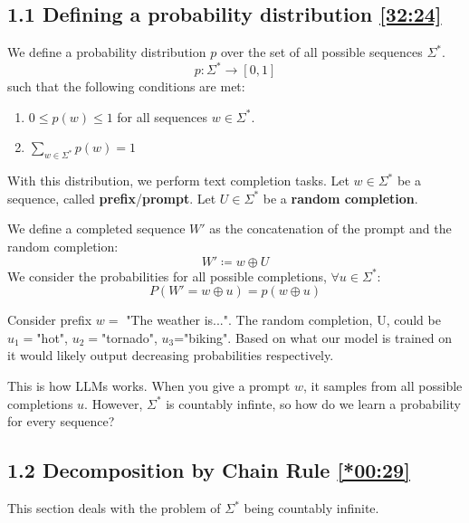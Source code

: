\documentclass[12pt, twoside]{article}
\begin{document}
\subsection*{1.1 Defining a probability distribution \href{https://youtu.be/3bG2Dy7Du0Y?si=g2tHZbM3oEpgRSpv&t=1944}{[32:24]}}

We define a probability distribution $p$ over the set of all possible sequences $\Sigma^*$.
\[ p: \Sigma^* \to [0, 1] \]
such that the following conditions are met:
\begin{enumerate}
    \item $0 \le p(w) \le 1$ for all sequences $w \in \Sigma^*$.
    \item $ \sum_{w \in \Sigma^*} p(w) = 1 $
\end{enumerate}


With this distribution, we perform text completion tasks. Let $w \in \Sigma^*$ be a sequence, called \textbf{prefix}/\textbf{prompt}. Let $U \in \Sigma^*$ be a \textbf{random completion}.

We define a completed sequence $W'$ as the concatenation of the prompt and the random completion:
\[ W' \coloneqq w \oplus U \]
We consider the probabilities for all possible completions, $\forall u \in \Sigma^*$:
\[ P(W' = w \oplus u) = p(w \oplus u) \]

\begin{example}
    Consider prefix $w =$ "The weather is...". The random completion, U, could be $u_1=$"hot", $u_2=$"tornado", $u_3$="biking". Based on what our model is trained on it would likely output decreasing probabilities respectively.
\end{example}

\begin{remark}
This is how LLMs works. When you give a prompt $w$, it samples from all possible completions $u$. However, $\Sigma^*$ is countably infinte, so how do we learn a probability for every sequence?
\end{remark}

\subsection*{1.2 Decomposition by Chain Rule \href{https://youtu.be/DR8bQPoRlX8?si=4XI5qRSxxBxY80oO&t=29}{[*00:29]}}

This section deals with the problem of $\Sigma^*$ being countably infinite.
\end{document}
